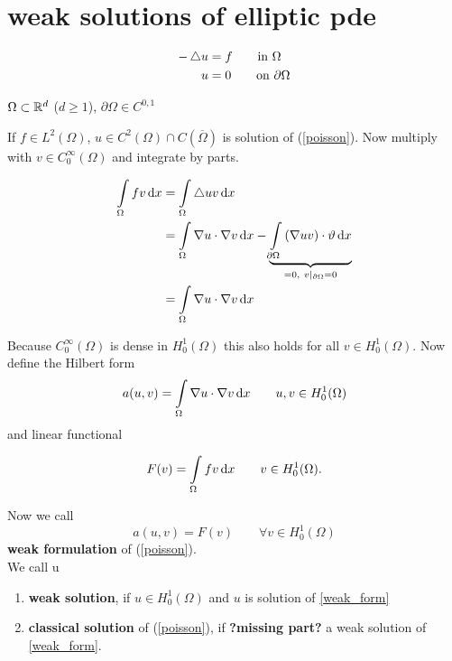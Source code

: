 \section{weak solutions of elliptic pde}

\begin{example}
	\begin{align}\label{poisson}
	-\mathop{}\!\mathbin\bigtriangleup u &= f \qquad \text{in } \Omega \\
	u &= 0 \qquad \text{on } \partial \Omega \nonumber
	\end{align}
	
	$\Omega \subset \mathbb{R}^d $ ($d \geq 1$), $\partial \Omega \in C^{0,1}$
\end{example}

If $f \in L^2(\Omega)$, $u \in C^2(\Omega)\cap C(\overline{\Omega})$ is solution of (\ref{poisson}). Now multiply with $v \in C^\infty_0 (\Omega)$ and integrate by parts.

\begin{align*}
	\int \limits_\Omega fv \mathop{}\!\mathrm{d} x &= \int \limits_\Omega \mathop{}\!\mathbin\bigtriangleup uv \mathop{}\!\mathrm{d} x\\
								   &= \int \limits_\Omega \nabla u \cdot \nabla v \mathop{}\!\mathrm{d} x - \underbrace{\int \limits_{\partial \Omega} \left( \nabla uv\right)\cdot \vartheta \mathop{}\!\mathrm{d} x}_{=0,\ v|_{\partial \Omega} = 0} \\
								   &= \int \limits_\Omega \nabla u \cdot \nabla v \mathop{}\!\mathrm{d} x
\end{align*}

Because $C^\infty_0(\Omega)$ is dense in $H^1_0(\Omega)$ this also holds for all $v \in H^1_0(\Omega)$. Now define the Hilbert form
\begin{equation*}
	a(u,v) = \int \limits_\Omega \nabla u \cdot \nabla v \mathop{}\!\mathrm{d} x \qquad u,v\in H^1_0(\Omega)
\end{equation*}
and linear functional

\begin{equation*}
	F(v) = \int \limits_\Omega fv \mathop{}\!\mathrm{d} x \qquad v \in H^1_0(\Omega).
\end{equation*}

Now we call 
\begin{equation}\label{weak_form}
	a(u,v) = F(v) \qquad \forall v \in  H^1_0(\Omega)
\end{equation}
\textbf{weak formulation} of (\ref{poisson}).\\

We call u
\begin{enumerate}[label=(\alph*)]
\item \textbf{weak solution}, if $u \in  H^1_0(\Omega)$ and $u$ is solution of \eqref{weak_form}
\item \textbf{classical solution} of (\ref{poisson}), if \textbf{?missing part?} a weak solution of \eqref{weak_form}. 
\end{enumerate}

